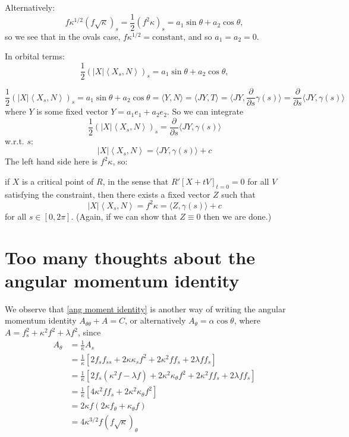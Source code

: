 \documentclass[12pt, a4paper]{amsart}
\theoremstyle{remark}
\begin{document}
 Alternatively:
 \begin{equation}  f\kappa^{1/2} (f\sqrt{\kappa})_s= \frac12(f^2\kappa)_s=a_1\sin\theta+a_2\cos\theta, \label{ang momentum f k 2}\end{equation}
 so we see that in the ovals case, $f\kappa^{1/2}=\text{constant}$, and so $a_1=a_2=0$.   


In orbital terms:
 $$
  \frac12 \left(|X| \left\langle {X_s},N\right\rangle\right)_s=
   a_1\sin\theta+a_2\cos\theta,$$
 
 
$$ \frac12 \left(|X|\left\langle {X_s},N\right\rangle\right)_s= a_1\sin\theta+a_2\cos\theta=\langle Y,N\rangle= \langle JY,T\rangle=\langle JY,\dfrac\partial{\partial s}\gamma(s)\rangle
=\dfrac\partial{\partial s} \langle JY,\gamma(s)\rangle $$
 where $Y$ is some fixed vector $Y=a_1 e_1+ a_2 e_2$.
 So we can integrate 
 $$ \frac12 \left(|X|\left\langle {X_s},N\right\rangle\right)_s= \dfrac\partial{\partial s} \langle JY,\gamma(s)\rangle $$
 w.r.t. $s$:
  $$ |X|\left\langle {X_s},N\right\rangle=  \langle JY,\gamma(s)\rangle  +c $$
The left hand side here is $f^2\kappa$, so:    

if $X$ is a critical point of $R$, in the sense that $R'[X+tV]_{t=0}=0$ for all $V$ satisfying the constraint, then there exists a fixed vector $Z$ such that  
\begin{equation} \label{ang moment identity}
|X|\left\langle {X_s},N\right\rangle=f^2\kappa=  \langle Z,\gamma(s)\rangle  +c
\end{equation}
for all $s\in[0,2\pi]$.     (Again, if we can show that $Z\equiv 0$ then we are done.)
 
 
 
 \section*{Too many thoughts about the angular momentum identity}
 
 We observe that \eqref{ang moment identity} is another way of writing the angular momentum identity $A_{\theta\theta}+ A=C$, or alternatively $A_\theta=\alpha \cos\theta$, where $A=f_s^2+\kappa^2 f^2 + \lambda f^2$, since 
 \begin{align*}
 A_\theta &= \frac1\kappa A_s \\
 &= \frac1\kappa\left[ 2f_s f_{ss} + 2\kappa \kappa_s f^2 + 2\kappa^2 f f_s + 2 \lambda ff_s \right] \\
 &= \frac1\kappa\left[ 2f_s\left( \kappa^2 f-\lambda f\right) + 2\kappa^2 \kappa_\theta f^2 + 2\kappa^2 ff_s + 2\lambda f f_s\right] \\
 &= \frac1\kappa \left[ 4\kappa^2 f f_s + 2\kappa^2 \kappa_\theta f^2\right] \\
 &= 2\kappa f\left( 2\kappa f_\theta + \kappa_\theta f\right) \\
 &= 4\kappa^{3/2} f \left(f\sqrt\kappa\right)_\theta
 \end{align*}
\end{document}
